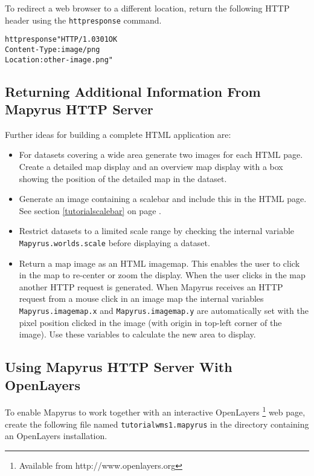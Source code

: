 To redirect a web browser to a different location,
return the following HTTP header using the \texttt{httpresponse}
command.

\begin{alltt}
httpresponse "HTTP/1.0 301 OK
Content-Type: image/png
Location: other-image.png"
\end{alltt}

\subsection{Returning Additional Information From Mapyrus HTTP Server}

Further ideas for building a complete HTML application are:

\begin{itemize}
\item
For datasets covering a wide area generate two images for
each HTML page.  Create a detailed map display and an overview map display
with a box showing the position of the detailed map in the dataset.

\item
Generate an image containing a scalebar
and include this in the HTML page.  See section \ref{tutorialscalebar}
on page \pageref{tutorialscalebar}.

\item
Restrict datasets to a limited scale range by checking the
internal variable
\texttt{Mapyrus.worlds.scale} before displaying a dataset.

\item
Return a map image as an HTML imagemap.  This enables the user to click
in the map to re-center or zoom the display.  When the user clicks
in the map another HTTP request is generated.  When Mapyrus receives
an HTTP request from a mouse click in an image map the internal variables
\texttt{Mapyrus.imagemap.x} and
\texttt{Mapyrus.imagemap.y} are automatically set with the pixel position
clicked in the image (with origin in top-left corner of the image).
Use these variables to calculate the new area to display.
\end{itemize}

\subsection{Using Mapyrus HTTP Server With OpenLayers}

To enable Mapyrus to work together with an interactive OpenLayers
\footnote{Available from http://www.openlayers.org}
web page, create the following file named
\texttt{tutorialwms1.mapyrus} in the directory containing an
OpenLayers installation.

